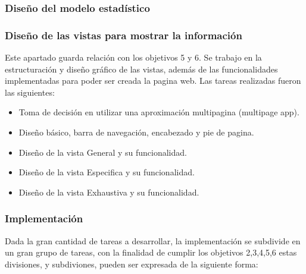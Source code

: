 \subsubsection{Diseño del modelo estadístico}

\subsubsection{Diseño de las vistas para mostrar la información}
Este apartado guarda relación con los objetivos 5 y 6. Se trabajo en la
estructuración y diseño gráfico de las vistas, además de las funcionalidades
implementadas para poder ser creada la pagina web. Las tareas realizadas
fueron las siguientes:

\begin{itemize}
    \item Toma de decisión en utilizar una aproximación multipagina (multipage app).
    \item Diseño básico, barra de navegación, encabezado y pie de pagina.
    \item Diseño de la vista General y su funcionalidad.
    \item Diseño de la vista Especifica y su funcionalidad.
    \item Diseño de la vista Exhaustiva y su funcionalidad.
\end{itemize}

\subsubsection{Implementación}
Dada la gran cantidad de tareas a desarrollar, la implementación se subdivide
en un gran grupo de tareas, con la finalidad de cumplir los objetivos 2,3,4,5,6
estas divisiones, y subdiviones, pueden ser expresada de la siguiente forma:

